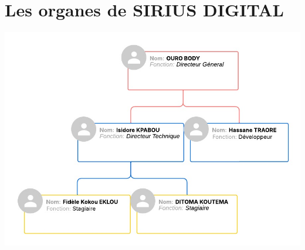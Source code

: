 \section{Les organes de SIRIUS DIGITAL}
\begin{center}
\includegraphics[scale=0.5]{images/logo/foc.png}
\end{center}




\clearpage